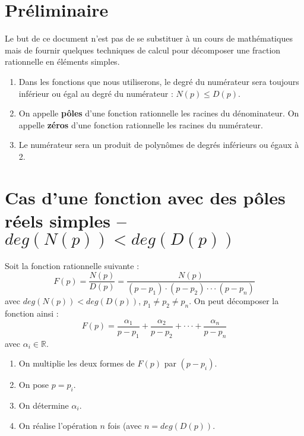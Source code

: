 \documentclass[10pt,fleqn]{article} %
\begin{document}


\section*{Préliminaire}

Le but de ce document n'est pas de se substituer à un cours de mathématiques mais de fournir quelques techniques de calcul pour décomposer une fraction rationnelle en éléments simples. 

\begin{rem}
\begin{enumerate}
\item Dans les fonctions que nous utiliserons, le degré du numérateur sera toujours inférieur ou égal au degré du numérateur : $N(p)\leq D(p)$.
\item On appelle \textbf{pôles} d'une fonction rationnelle les racines du dénominateur. On appelle \textbf{zéros} d'une fonction rationnelle les racines du numérateur.
\item Le numérateur sera un produit de polynômes de degrés inférieurs ou égaux à 2. 
\end{enumerate}
\end{rem}

\section{Cas d'une fonction avec des pôles réels simples -- $deg(N(p)) < deg(D(p))$}

\begin{resultat}
Soit la fonction rationnelle suivante :
$$
F(p) = \dfrac{N(p)}{D(p)} =\dfrac{N(p)}{(p-p_1)\cdot (p-p_2)\cdot \cdot \cdot (p-p_n)}
$$
avec $deg(N(p)) < deg(D(p))$, $p_1\neq p_2\neq p_n$. On peut décomposer la fonction ainsi :
$$
F(p) = \dfrac{\alpha_1}{p-p_1} + \dfrac{\alpha_2}{p-p_2} 
+ \cdot \cdot \cdot + 
\dfrac{\alpha_n}{p-p_n} 
$$
avec $\alpha_i\in \mathbb{R}$.
\end{resultat}

\begin{resultat}
\begin{enumerate}
\item On multiplie les deux formes de $F(p)$ par $(p-p_i)$.
\item On pose $p=p_i$.
\item On détermine $\alpha_i$.
\item On réalise l'opération $n$ fois (avec $n=deg(D(p))$.
\end{enumerate}
\end{resultat}
\end{document}
